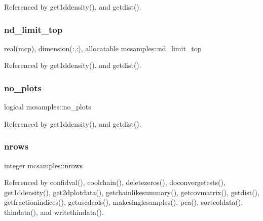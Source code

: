 Referenced by get1ddensity(), and getdist().

\mbox{\label{namespacemcsamples_a381886fbfe1702b96dbe899d11a79daa}} 
\subsubsection{\texorpdfstring{nd\+\_\+limit\+\_\+top}{nd\_limit\_top}}
{\footnotesize\ttfamily real(mcp), dimension(\+:,\+:), allocatable mcsamples\+::nd\+\_\+limit\+\_\+top}



Referenced by get1ddensity(), and getdist().

\mbox{\label{namespacemcsamples_a38fc836d9b47b5b811c875938d43d2c9}} 
\subsubsection{\texorpdfstring{no\+\_\+plots}{no\_plots}}
{\footnotesize\ttfamily logical mcsamples\+::no\+\_\+plots}



Referenced by get1ddensity(), and getdist().

\mbox{\label{namespacemcsamples_a3bf0377c41ca6723a2a682fdec7c7cba}} 
\subsubsection{\texorpdfstring{nrows}{nrows}}
{\footnotesize\ttfamily integer mcsamples\+::nrows}



Referenced by confidval(), coolchain(), deletezeros(), doconvergetests(), get1ddensity(), get2dplotdata(), getchainlikesummary(), getcovmatrix(), getdist(), getfractionindices(), getusedcols(), makesinglesamples(), pca(), sortcoldata(), thindata(), and writethindata().

\mbox{\label{namespacemcsamples_a5b2ac0e6e68dd652c494d1b7bd789f96}} 
